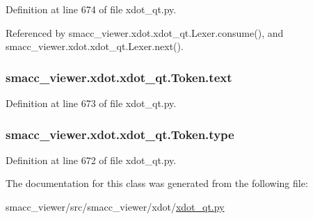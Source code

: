 Definition at line 674 of file xdot\+\_\+qt.\+py.



Referenced by smacc\+\_\+viewer.\+xdot.\+xdot\+\_\+qt.\+Lexer.\+consume(), and smacc\+\_\+viewer.\+xdot.\+xdot\+\_\+qt.\+Lexer.\+next().

\subsubsection[{\texorpdfstring{text}{text}}]{\setlength{\rightskip}{0pt plus 5cm}smacc\+\_\+viewer.\+xdot.\+xdot\+\_\+qt.\+Token.\+text}\hypertarget{classsmacc__viewer_1_1xdot_1_1xdot__qt_1_1Token_ab91dfc81bcb5ccee85aa2afbdd2458e5}{}\label{classsmacc__viewer_1_1xdot_1_1xdot__qt_1_1Token_ab91dfc81bcb5ccee85aa2afbdd2458e5}


Definition at line 673 of file xdot\+\_\+qt.\+py.

\subsubsection[{\texorpdfstring{type}{type}}]{\setlength{\rightskip}{0pt plus 5cm}smacc\+\_\+viewer.\+xdot.\+xdot\+\_\+qt.\+Token.\+type}\hypertarget{classsmacc__viewer_1_1xdot_1_1xdot__qt_1_1Token_a7fe2400bff8e8afe706b99cd08ed54d2}{}\label{classsmacc__viewer_1_1xdot_1_1xdot__qt_1_1Token_a7fe2400bff8e8afe706b99cd08ed54d2}


Definition at line 672 of file xdot\+\_\+qt.\+py.



The documentation for this class was generated from the following file\+:\begin{DoxyCompactItemize}
\item 
smacc\+\_\+viewer/src/smacc\+\_\+viewer/xdot/\hyperlink{xdot__qt_8py}{xdot\+\_\+qt.\+py}\end{DoxyCompactItemize}
